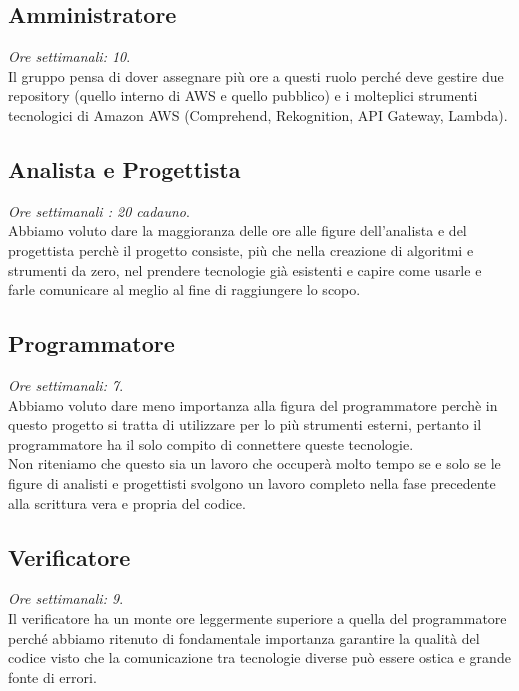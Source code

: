 \documentclass{classes/base}
\begin{document}
    \subsection*{Amministratore}
    \textit{Ore settimanali: 10}.\\
    Il gruppo pensa di dover assegnare più ore a questi ruolo perché deve gestire due repository (quello interno di AWS e quello pubblico) e i molteplici strumenti tecnologici di Amazon AWS (Comprehend, Rekognition, API Gateway, Lambda).
    \subsection*{Analista e Progettista}
    \textit{Ore settimanali : 20 cadauno}.\\
    Abbiamo voluto dare la maggioranza delle ore alle figure dell'analista e del progettista perchè il progetto consiste, più che nella creazione di algoritmi e strumenti da zero, nel prendere tecnologie già esistenti e capire come usarle e farle comunicare al meglio al fine di raggiungere lo scopo. 
    \subsection*{Programmatore}
    \textit{Ore settimanali: 7}.\\
    Abbiamo voluto dare meno importanza alla figura del programmatore perchè in questo progetto si tratta di utilizzare per lo più strumenti esterni, pertanto il programmatore ha il solo compito di connettere queste tecnologie.\\ Non riteniamo che questo sia un lavoro che occuperà molto tempo se e solo se le figure di analisti e progettisti svolgono un lavoro completo nella fase precedente alla scrittura vera e propria del codice.
    \subsection*{Verificatore}
    \textit{Ore settimanali: 9}.\\
    Il verificatore ha un monte ore leggermente superiore a quella del programmatore perché abbiamo ritenuto di fondamentale importanza garantire la qualità del codice visto che la comunicazione tra tecnologie diverse può essere ostica e grande fonte di errori.\\\\
    
\end{document}
